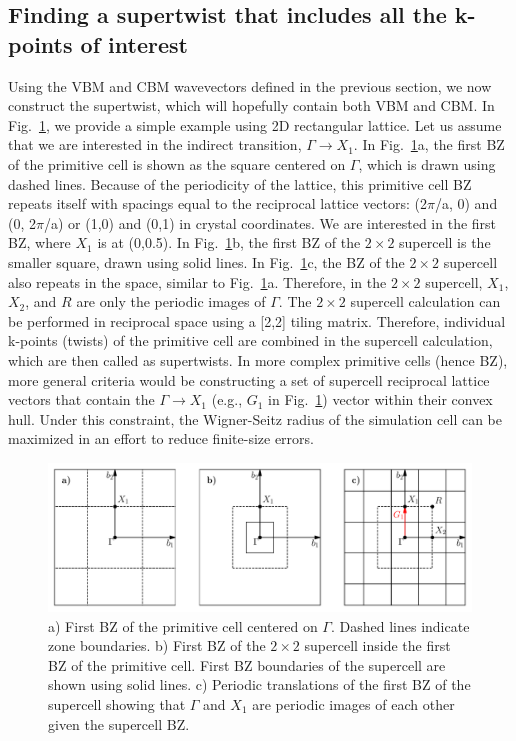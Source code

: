 \subsection{Finding a supertwist that includes all the k-points of interest}
Using the VBM and CBM wavevectors defined in the previous section, we now construct the supertwist, which will hopefully contain both VBM and CBM. In Fig.~\ref{fig:lab_ex_twists}, we provide a simple example using 2D rectangular lattice. 
Let us assume that we are interested in the indirect transition, $\Gamma \rightarrow X_1$. 
In Fig.~\ref{fig:lab_ex_twists}a, the first BZ of the primitive cell is shown as the square centered on $\Gamma$, which is drawn using dashed lines. Because of the periodicity of the lattice, this primitive cell BZ repeats itself with spacings equal to the reciprocal lattice vectors: (2$\pi$/a, 0) and (0, 2$\pi$/a) or (1,0) and (0,1) in crystal coordinates. 
We are interested in the  first BZ, where $X_1$ is at (0,0.5). 
In Fig.~\ref{fig:lab_ex_twists}b, the first BZ of the $2\times2$ supercell is the smaller square, drawn using solid lines. 
In Fig.~\ref{fig:lab_ex_twists}c, the BZ of the $2\times2$ supercell also repeats in the space, similar to Fig.~\ref{fig:lab_ex_twists}a. 
Therefore, in the $2\times2$ supercell, $X_1$, $X_2$, and $R$ are only the periodic images of $\Gamma$. The $2\times2$ supercell calculation can be performed in reciprocal space using a  [2,2] tiling matrix. 
Therefore, individual k-points (twists) of the primitive cell are combined in the supercell calculation, which are then called as supertwists. 
In more complex primitive cells (hence BZ), more general criteria would be constructing a set of supercell reciprocal lattice vectors that contain the $\Gamma \rightarrow X_1$ (e.g., $G_1$ in Fig.~\ref{fig:lab_ex_twists}) vector within their convex hull. 
Under this constraint, the Wigner-Seitz radius of the simulation cell can be maximized in an effort to reduce finite-size errors. 

\begin{figure}
	\includegraphics[width=\textwidth]{figures/lab_excited_twists}
	\caption{a) First BZ of the primitive cell centered on $\Gamma$. Dashed lines indicate zone boundaries. b) First BZ of the $2\times2$ supercell inside the first BZ of the primitive cell. First BZ boundaries of the supercell are shown using solid lines. c) Periodic translations of the first BZ of the supercell showing that $\Gamma$ and $X_1$ are periodic images of each other given the supercell BZ. }
	\label{fig:lab_ex_twists}
\end{figure}

